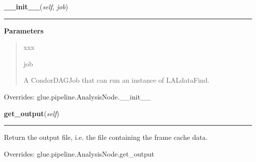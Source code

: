     \begin{boxedminipage}{\textwidth}

    \raggedright \textbf{\_\_init\_\_}(\textit{self}, \textit{job})

    \vspace{-1.5ex}

    \rule{\textwidth}{0.5\fboxrule}
    \vspace{1ex}

      \textbf{Parameters}
      \begin{quote}
        \begin{Ventry}{xxx}

          \item[job]

          A CondorDAGJob that can run an instance of LALdataFind.

        \end{Ventry}

      \end{quote}

    \vspace{1ex}

      Overrides: glue.pipeline.AnalysisNode.\_\_init\_\_

    \end{boxedminipage}

    \label{stochastic:LSCDataFindNode:get_output}
    \vspace{0.5ex}

    \begin{boxedminipage}{\textwidth}

    \raggedright \textbf{get\_output}(\textit{self})

    \vspace{-1.5ex}

    \rule{\textwidth}{0.5\fboxrule}
    Return the output file, i.e. the file containing the frame cache 
    data.

    \vspace{1ex}

      Overrides: glue.pipeline.AnalysisNode.get\_output

    \end{boxedminipage}

    \label{stochastic:LSCDataFindNode:set_end}
    \vspace{0.5ex}

